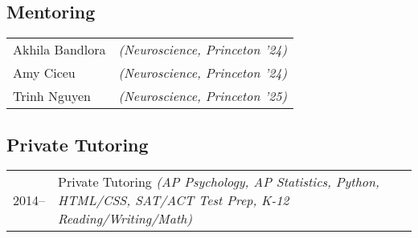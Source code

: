 \documentclass[10pt,a4paper]{cv_public}
\begin{document}
\subsection{Mentoring}

\vspace{2.5pt}

\vspace{5pt}
\begin{tabular}{p{1.2in}<{\raggedleft\arraybackslash}p{2in}<{\raggedright\arraybackslash}}
Akhila Bandlora & \textsl{(Neuroscience, Princeton '24)} \\
Amy Ciceu & \textsl{(Neuroscience, Princeton '24)} \\
Trinh Nguyen & \textsl{(Neuroscience, Princeton '25)}
\end{tabular}

\vspace{7.5pt}
\subsection{Private Tutoring}
\begin{tabular}{p{1in}<{\raggedleft\arraybackslash}p{4.935in}<{\raggedright\arraybackslash}}
2014⁠–⁠ & Private Tutoring \textsl{(AP Psychology, AP Statistics, Python, HTML/CSS, SAT/ACT Test Prep, K-12 Reading/Writing/Math)} \end{tabular}
\vspace{-5pt}



\end{document}
